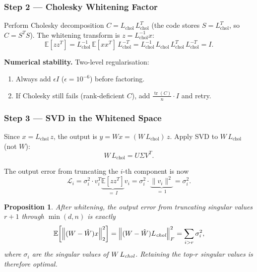 \documentclass[11pt,a4paper]{article}
\DeclareMathOperator{\tr}{tr}
\newcommand{\Ebb}{\mathbb{E}}
\newcommand{\norm}[1]{\left\|#1\right\|}
\newtheorem{proposition}{Proposition}
\theoremstyle{remark}
\begin{document}
\subsubsection*{Step 2 --- Cholesky Whitening Factor}

Perform Cholesky decomposition $C = L_{\text{chol}}\,L_{\text{chol}}^T$
(the code stores $S = L_{\text{chol}}^T$, so $C = S^TS$).
The whitening transform is $z = L_{\text{chol}}^{-1}x$:
\begin{equation}
  \Ebb[zz^T]
  = L_{\text{chol}}^{-1}\,\Ebb[xx^T]\,L_{\text{chol}}^{-T}
  = L_{\text{chol}}^{-1}\,L_{\text{chol}}\,L_{\text{chol}}^T\,L_{\text{chol}}^{-T}
  = I.
\end{equation}

\textbf{Numerical stability.}  Two-level regularisation:
\begin{enumerate}[noitemsep]
  \item Always add $\epsilon I$ ($\epsilon=10^{-6}$) before factoring.
  \item If Cholesky still fails (rank-deficient $C$), add
        $\frac{\tr(C)}{n}\cdot I$ and retry.
\end{enumerate}

\subsubsection*{Step 3 --- SVD in the Whitened Space}

Since $x = L_{\text{chol}}\,z$, the output is
$y = Wx = (W\,L_{\text{chol}})\,z$.  Apply SVD to $W\,L_{\text{chol}}$
(not $W$):
\begin{equation}
  W\,L_{\text{chol}} = U\Sigma V^T.
\end{equation}

The output error from truncating the $i$-th component is now
\begin{equation}
  \mathcal{L}_i
  = \sigma_i^2 \cdot v_i^T \underbrace{\Ebb[zz^T]}_{=\,I} v_i
  = \sigma_i^2 \cdot \underbrace{\|v_i\|^2}_{=\,1}
  = \sigma_i^2.
\end{equation}

\begin{tcolorbox}[keybox={Main result}]
\begin{proposition}
After whitening, the output error from truncating singular values $r{+}1$
through $\min(d,n)$ is exactly
\begin{equation}
  \Ebb\!\left[\norm{(W-\hat{W})x}_2^2\right]
  = \norm{(W-\hat{W})L_{\emph{chol}}}_F^2 = \sum_{i>r}\sigma_i^2,
\end{equation}
where $\sigma_i$ are the singular values of $W\,L_{\emph{chol}}$.
Retaining the top-$r$ singular values is therefore optimal.
\end{proposition}
\end{tcolorbox}
\end{document}
